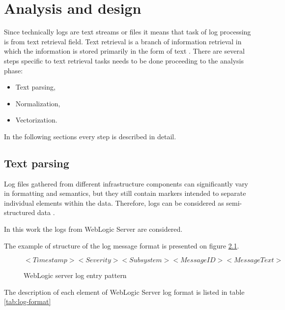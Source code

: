 \documentclass[thesis=M,english]{FITthesis}[2019/12/23]
\begin{document}
\section{}

\chapter{Analysis and design}
Since technically logs are text streams or files it means that task of log processing is from text retrieval field. Text retrieval is a branch of information retrieval in which the information is stored primarily in the form of text \cite{text-retrieval-definition}. There are several steps specific to text retrieval tasks needs to be done proceeding to the analysis phase:
\begin{itemize}
	\item Text parsing,
	\item Normalization,
	\item Vectorization.
\end{itemize}
In the following sections every step is described in detail.

\section{Text parsing}
Log files gathered from different infrastructure components can significantly vary in formatting and semantics, but they still contain markers intended to separate individual elements within the data. Therefore, logs can be considered as semi-structured data \cite{semi-structured-data-graylog, semi-structured-data-definition}. 

In this work the logs from WebLogic Server are considered. 

The example of structure of the log message format is presented on figure \ref{fig:wls-log-entry-pattern}.

\begin{figure}\label{fig:wls-log-entry-pattern}
	\[<Timestamp> <Severity> <Subsystem> <Message ID> <Message Text>\]
\caption{WebLogic server log entry pattern}
\end{figure}

The description of each element of WebLogic Server log format is listed in table \ref{tab:log-format}
\end{document}
